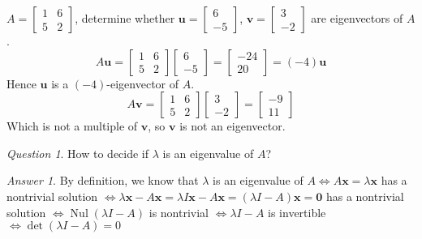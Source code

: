 \documentclass{beamer}
\DeclareMathOperator{\Nul}{Nul}
\theoremstyle{definition}
\theoremstyle{remark}
\newtheorem*{question}{Question}
\newtheorem*{answer}{Answer}
\begin{document}
\begin{frame}[t]
\begin{example}
$A=\begin{bmatrix}
1&6\\5&2
\end{bmatrix}$, determine whether $\mathbf u=\begin{bmatrix}
6\\-5
\end{bmatrix}$, $\mathbf v=\begin{bmatrix}
3\\-2
\end{bmatrix}$ are eigenvectors of $A$.\pause
\[
A\mathbf u=\begin{bmatrix}
1&6\\5&2
\end{bmatrix}\begin{bmatrix}
6\\-5
\end{bmatrix}=\begin{bmatrix}
-24\\20
\end{bmatrix}=(-4)\mathbf u
\]
Hence $\mathbf u$ is a $(-4)$-eigenvector of $A$.\pause
\[
A\mathbf v=\begin{bmatrix}
1&6\\5&2
\end{bmatrix}\begin{bmatrix}
3\\-2
\end{bmatrix}=\begin{bmatrix}
-9\\11
\end{bmatrix}
\]
Which is not a multiple of $\mathbf v$, so $\mathbf v$ is not an eigenvector.
\end{example}
\end{frame}

\begin{frame}[t]
\begin{question}
How to decide if $\lambda$ is an eigenvalue of $A$?
\end{question}
\pause
\begin{answer}
By definition, we know that $\lambda$ is an eigenvalue of $A\iff A\mathbf x=\lambda\mathbf x$ has a nontrivial solution $\iff \lambda\mathbf x-A\mathbf x=\lambda I\mathbf x-A\mathbf x=(\lambda I-A)\mathbf x=\mathbf 0$ has a nontrivial solution $\iff\Nul(\lambda I-A)$ is nontrivial $\iff \lambda I-A$ is invertible $\iff\det(\lambda I-A)=0$
\end{answer}
\end{frame}
\end{document}
